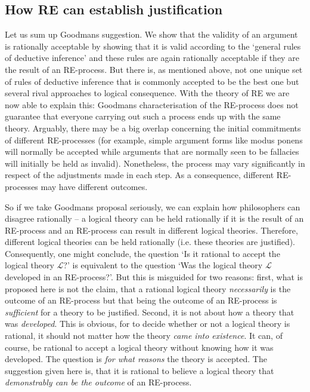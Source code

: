 \documentclass{article}
\begin{document}
\subsection{How RE can establish justification}
Let us sum up Goodmans suggestion. We show that the validity of an argument is rationally acceptable by showing that it is valid according to the `general rules of deductive inference' \cite[p. 63-64]{Goodman} and these rules are again rationally acceptable if they are the result of an RE-process. But there is, as mentioned above, not one unique set of rules of deductive inference that is commonly accepted to be the best one but several rival approaches to logical consequence. With the theory of RE we are now able to explain this: Goodmans characterisation of the RE-process does not guarantee that everyone carrying out such a process ends up with the same theory. Arguably, there may be a big overlap concerning the initial commitments of different RE-processes (for example, simple argument forms like modus ponens will normally be accepted while arguments that are normally seen to be fallacies will initially be held as invalid). Nonetheless, the process may vary significantly in respect of the adjustments made in each step. As a consequence, different RE-processes may have different outcomes.

So if we take Goodmans proposal seriously, we can explain how philosophers can disagree rationally -- a logical theory can be held rationally if it is the result of an RE-process and an RE-process can result in different logical theories. Therefore, different logical theories can be held rationally (i.e. these theories are justified). Consequently, one might conclude, the question `Is it rational to accept the logical theory $\mathcal{L}$?' is equivalent to the question `Was the logical theory $\mathcal{L}$ developed in an RE-process?'. But this is misguided for two reasons: first, what is proposed here is not the claim, that a rational logical theory \textit{necessarily} is the outcome of an RE-process but that being the outcome of an RE-process is \textit{sufficient} for a theory to be justified. Second, it is not about how a theory that was \textit{developed}. This is obvious, for to decide whether or not a logical theory is rational, it should not matter how the theory \textit{came into existence}. It can, of course, be rational to accept a logical theory without knowing how it was developed. The question is \textit{for what reasons} the theory is accepted. The suggestion given here is, that it is rational to believe a logical theory that \textit{demonstrably can be the outcome} of an RE-process. 
\end{document}

